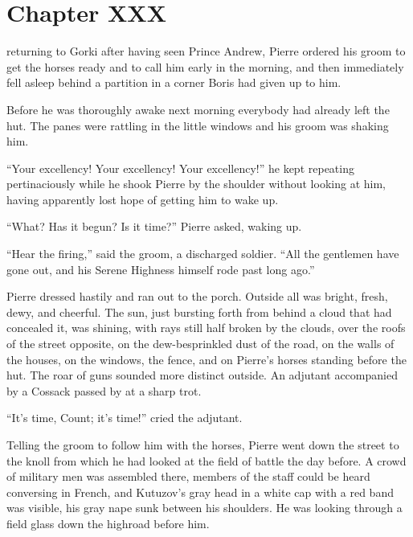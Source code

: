 \chapter*{Chapter XXX} \ifaudio {}
\fi

 returning to Gorki after having seen Prince Andrew, Pierre
ordered his groom to get the horses ready and to call him early
in the morning, and then immediately fell asleep behind a
partition in a corner Boris had given up to him.

Before he was thoroughly awake next morning everybody had already
left the hut. The panes were rattling in the little windows and
his groom was shaking him.

``Your excellency! Your excellency! Your excellency!'' he kept
repeating pertinaciously while he shook Pierre by the shoulder
without looking at him, having apparently lost hope of getting
him to wake up.

``What? Has it begun? Is it time?'' Pierre asked, waking up.

``Hear the firing,'' said the groom, a discharged soldier. ``All
the gentlemen have gone out, and his Serene Highness himself rode
past long ago.''

Pierre dressed hastily and ran out to the porch. Outside all was
bright, fresh, dewy, and cheerful. The sun, just bursting forth
from behind a cloud that had concealed it, was shining, with rays
still half broken by the clouds, over the roofs of the street
opposite, on the dew-besprinkled dust of the road, on the walls
of the houses, on the windows, the fence, and on Pierre's horses
standing before the hut. The roar of guns sounded more distinct
outside. An adjutant accompanied by a Cossack passed by at a
sharp trot.

``It's time, Count; it's time!'' cried the adjutant.

Telling the groom to follow him with the horses, Pierre went down
the street to the knoll from which he had looked at the field of
battle the day before. A crowd of military men was assembled
there, members of the staff could be heard conversing in French,
and Kutuzov's gray head in a white cap with a red band was
visible, his gray nape sunk between his shoulders. He was looking
through a field glass down the highroad before him.

